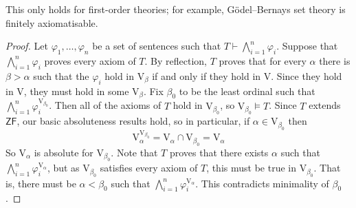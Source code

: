 This only holds for first-order theories; for example, G\"odel--Bernays set theory is finitely axiomatisable.
\begin{proof}
    Let \( \varphi_1, \dots, \varphi_n \) be a set of sentences such that \( T \vdash \bigwedge_{i=1}^n \varphi_i \).
    Suppose that \( \bigwedge_{i=1}^n \varphi_i \) proves every axiom of \( T \).
    By reflection, \( T \) proves that for every \( \alpha \) there is \( \beta > \alpha \) such that the \( \varphi_i \) hold in \( \mathrm{V}_\beta \) if and only if they hold in \( \mathrm{V} \).
    Since they hold in \( \mathrm{V} \), they must hold in some \( \mathrm{V}_\beta \).
    Fix \( \beta_0 \) to be the least ordinal such that \( \bigwedge_{i=1}^n \varphi_i^{\mathrm{V}_{\beta_0}} \).
    Then all of the axioms of \( T \) hold in \( \mathrm{V}_{\beta_0} \), so \( \mathrm{V}_{\beta_0} \vDash T \).
    Since \( T \) extends \( \mathsf{ZF} \), our basic absoluteness results hold, so in particular, if \( \alpha \in \mathrm{V}_{\beta_0} \) then
    \[ \mathrm{V}_\alpha^{\mathrm{V}_{\beta_0}} = \mathrm{V}_\alpha \cap \mathrm{V}_{\beta_0} = \mathrm{V}_\alpha \]
    So \( \mathrm{V}_\alpha \) is absolute for \( \mathrm{V}_{\beta_0} \).
    Note that \( T \) proves that there exists \( \alpha \) such that \( \bigwedge_{i=1}^n \varphi_i^{\mathrm{V}_\alpha} \), but as \( \mathrm{V}_{\beta_0} \) satisfies every axiom of \( T \), this must be true in \( \mathrm{V}_{\beta_0} \).
    That is, there must be \( \alpha < \beta_0 \) such that \( \bigwedge_{i=1}^n \varphi_i^{\mathrm{V}_\alpha} \).
    This contradicts minimality of \( \beta_0 \).
\end{proof}

